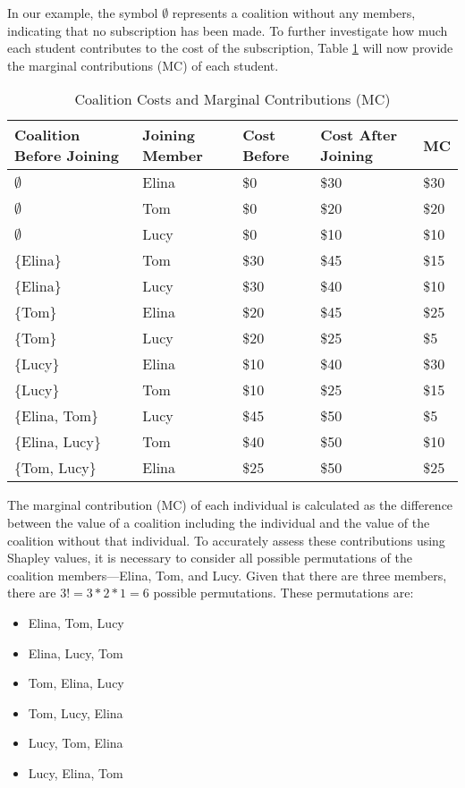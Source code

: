 \documentclass[12pt]{article}
\begin{document}
In our example, the symbol $\emptyset$ represents a coalition without any members, indicating that no subscription has been made. To further investigate how much each student contributes to the cost of the subscription, Table \ref{tab:coalition_costs} will now provide the marginal contributions (MC) of each student.
\begin{table}[htbp]
	\centering
	\caption{Coalition Costs and Marginal Contributions (MC)}
	\begin{tabular}{lllll}
		\toprule
		Coalition Before Joining & Joining Member & Cost Before & Cost After Joining & MC \\
		\midrule
		$\emptyset$ & Elina & \$0 & \$30 & \$30 \\
		$\emptyset$ & Tom & \$0 & \$20 & \$20 \\
		$\emptyset$ & Lucy & \$0 & \$10 & \$10 \\
		\{Elina\} & Tom & \$30 & \$45 & \$15 \\
		\{Elina\} & Lucy & \$30 & \$40 & \$10 \\
		\{Tom\} & Elina & \$20 & \$45 & \$25 \\
		\{Tom\} & Lucy & \$20 & \$25 & \$5 \\
		\{Lucy\} & Elina & \$10 & \$40 & \$30 \\
		\{Lucy\} & Tom & \$10 & \$25 & \$15 \\
		\{Elina, Tom\} & Lucy & \$45 & \$50 & \$5 \\
		\{Elina, Lucy\} & Tom & \$40 & \$50 & \$10 \\
		\{Tom, Lucy\} & Elina & \$25 & \$50 & \$25 \\
		\bottomrule
	\end{tabular}%
	\label{tab:coalition_costs}%
\end{table}%
The marginal contribution (MC) of each individual is calculated as the difference between the value of a coalition including the individual and the value of the coalition without that individual. To accurately assess these contributions using Shapley values, it is necessary to consider all possible permutations of the coalition members—Elina, Tom, and Lucy. Given that there are three members, there are $ 3! = 3 * 2 * 1 = 6$ possible permutations. These permutations are: 
\begin{itemize}
	\item Elina, Tom, Lucy
	\item Elina, Lucy, Tom
	\item Tom, Elina, Lucy
	\item Tom, Lucy, Elina
	\item Lucy, Tom, Elina
	\item Lucy, Elina, Tom
\end{itemize}
\end{document}

